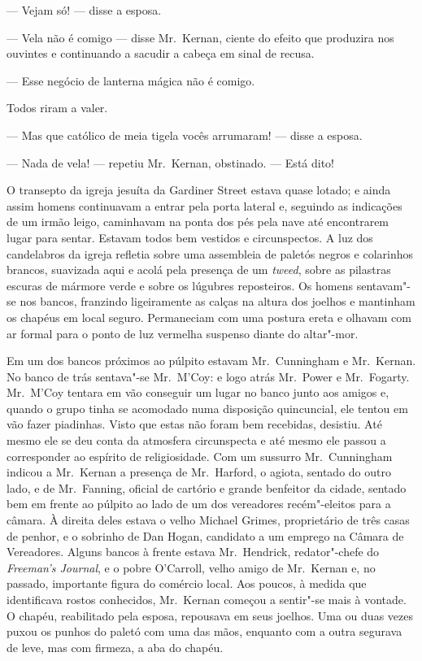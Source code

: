 --- Vejam só! --- disse a esposa.

--- Vela não é comigo --- disse Mr.~Kernan, ciente do efeito que produzira nos
ouvintes e continuando a sacudir a cabeça em sinal de recusa.

--- Esse negócio de lanterna mágica não é comigo.  

Todos riram a valer.

--- Mas que católico de meia tigela vocês arrumaram! --- disse a esposa.

--- Nada de vela! --- repetiu Mr.~Kernan, obstinado.  --- Está dito!

\smallskip

\noindent\dotfill

\smallskip

O transepto da igreja jesuíta da Gardiner Street estava quase lotado; e ainda
assim homens continuavam a entrar pela porta lateral e, seguindo as indicações
de um irmão leigo, caminhavam na ponta dos pés pela nave até encontrarem lugar
para sentar.  Estavam todos bem vestidos e circunspectos.  A luz dos
candelabros da igreja refletia sobre uma assembleia de paletós negros e
colarinhos brancos, suavizada aqui e acolá pela presença de um \textit{tweed},
sobre as pilastras escuras de mármore verde e sobre os lúgubres reposteiros.
Os homens sentavam"-se nos bancos, franzindo ligeiramente as calças na altura
dos joelhos e mantinham os chapéus em local seguro.  Permaneciam com uma
postura ereta e olhavam com ar formal para o ponto de luz vermelha suspenso
diante do altar"-mor.

Em um dos bancos próximos ao púlpito estavam Mr.~Cunningham e Mr.~Kernan.  No
banco de trás sentava"-se Mr.~M’Coy: e logo atrás Mr.~Power e Mr.~Fogarty.  
Mr.~M’Coy tentara em vão conseguir um lugar no banco junto aos amigos e, quando o
grupo tinha se acomodado numa disposição quincuncial, ele tentou em vão fazer
piadinhas.  Visto que estas não foram bem recebidas, desistiu.  Até mesmo ele
se deu conta da atmosfera circunspecta e até mesmo ele passou a corresponder ao
espírito de religiosidade.  Com um sussurro Mr.~Cunningham indicou a Mr.~Kernan
a presença de Mr.~Harford, o agiota, sentado do outro lado, e de Mr.~Fanning,
oficial de cartório e grande benfeitor da cidade, sentado bem em frente ao
púlpito ao lado de um dos vereadores recém"-eleitos para a câmara.  À direita
deles estava o velho Michael Grimes, proprietário de três casas de penhor, e o
sobrinho de Dan Hogan, candidato a um emprego na Câmara de Vereadores.  Alguns
bancos à frente estava Mr.~Hendrick, redator"-chefe do \textit{Freeman’s
Journal}, e o pobre O’Carroll, velho amigo de Mr.~Kernan e, no passado,
importante figura do comércio local.  Aos poucos, à medida que identificava
rostos conhecidos, Mr.~Kernan começou a sentir"-se mais à vontade.  O chapéu,
reabilitado pela esposa, repousava em seus joelhos.  Uma ou duas vezes puxou os
punhos do paletó com uma das mãos, enquanto com a outra segurava de leve, mas
com firmeza, a aba do chapéu.

